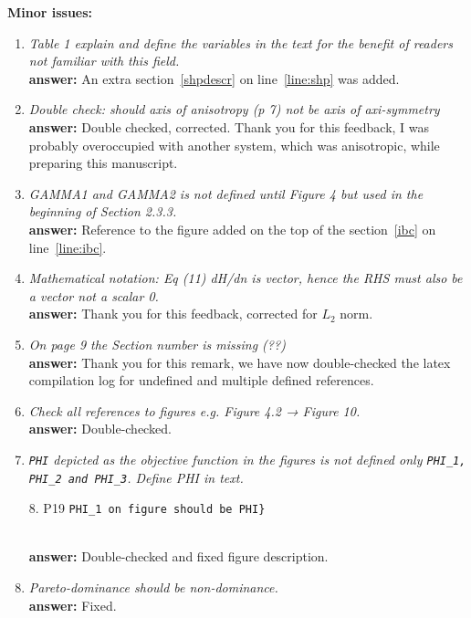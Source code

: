\documentclass[final,3p, 11pt, a4paper]{elsarticle}
\begin{document}
{\bf Minor issues:}

\begin{enumerate}
\item {\it Table 1 explain and define the variables in the text for the benefit of readers not familiar with this field.} \\
{\bf answer:} An extra section~\ref{shpdescr} on line~\ref{line:shp} was added.
 
 \item {\it Double check: should axis of anisotropy (p 7) not be axis of axi-symmetry} \\
  {\bf answer:} Double checked, corrected. Thank you for this feedback, I was probably overoccupied with another system, which was anisotropic, while preparing this manuscript.
 
 \item {\it GAMMA1 and GAMMA2 is not defined until Figure 4 but used in the beginning of Section 2.3.3.}\\
 {\bf answer:} Reference to the figure added on the top of the section~\ref{ibc} on line~\ref{line:ibc}.
 
 \item {\it Mathematical notation: Eq (11) dH/dn is vector, hence the RHS must also be a vector not a scalar 0.} \\
 {\bf answer:} Thank you for this feedback, corrected for $L_2$ norm.
 
 \item {\it  On page 9 the Section number is missing (??)}\\
 {\bf answer:}  Thank you for this remark, we have now double-checked the latex compilation log for undefined and multiple defined references.
 
 \item {\it  Check all references to figures e.g. Figure 4.2 → Figure 10.} \\
 {\bf answer:} Double-checked.
 
 \item {\it \verb(PHI( depicted as the objective function in the figures is not defined only \verb(PHI_1, PHI_2 and PHI_3(. Define PHI in text.

 8. P19 \verb(PHI_1 on figure should be PHI}( }\\
 {\bf answer:} Double-checked and fixed figure description.
 
 \item {\it  Pareto-dominance should be non-dominance.} \\ 
 {\bf answer:} Fixed.
 
 
 \end{enumerate}
\end{document}
